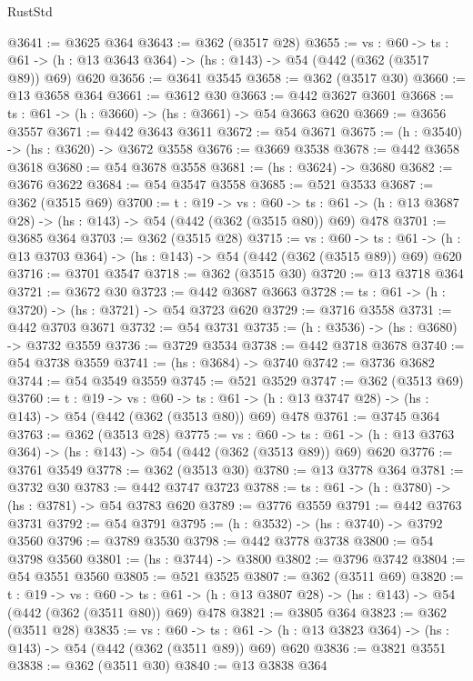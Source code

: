 \begin{lexlean}{RustStd}
\begin{coremodule}
@3641 := @3625 @364
@3643 := @362 (@3517 @28)
@3655 := {vs : @60} ->
  {ts : @61} -> (h : @13 @3643 @364) -> (hs : @143) -> @54 (@442 (@362 (@3517 @89)) @69) @620
@3656 := @3641 @3545
@3658 := @362 (@3517 @30)
@3660 := @13 @3658 @364
@3661 := @3612 @30
@3663 := @442 @3627 @3601
@3668 := {ts : @61} -> (h : @3660) -> (hs : @3661) -> @54 @3663 @620
@3669 := @3656 @3557
@3671 := @442 @3643 @3611
@3672 := @54 @3671
@3675 := (h : @3540) -> (hs : @3620) -> @3672 @3558
@3676 := @3669 @3538
@3678 := @442 @3658 @3618
@3680 := @54 @3678 @3558
@3681 := (hs : @3624) -> @3680
@3682 := @3676 @3622
@3684 := @54 @3547 @3558
@3685 := @521 @3533
@3687 := @362 (@3515 @69)
@3700 := {t : @19} ->
  {vs : @60} ->
  {ts : @61} -> (h : @13 @3687 @28) -> (hs : @143) -> @54 (@442 (@362 (@3515 @80)) @69) @478
@3701 := @3685 @364
@3703 := @362 (@3515 @28)
@3715 := {vs : @60} ->
  {ts : @61} -> (h : @13 @3703 @364) -> (hs : @143) -> @54 (@442 (@362 (@3515 @89)) @69) @620
@3716 := @3701 @3547
@3718 := @362 (@3515 @30)
@3720 := @13 @3718 @364
@3721 := @3672 @30
@3723 := @442 @3687 @3663
@3728 := {ts : @61} -> (h : @3720) -> (hs : @3721) -> @54 @3723 @620
@3729 := @3716 @3558
@3731 := @442 @3703 @3671
@3732 := @54 @3731
@3735 := (h : @3536) -> (hs : @3680) -> @3732 @3559
@3736 := @3729 @3534
@3738 := @442 @3718 @3678
@3740 := @54 @3738 @3559
@3741 := (hs : @3684) -> @3740
@3742 := @3736 @3682
@3744 := @54 @3549 @3559
@3745 := @521 @3529
@3747 := @362 (@3513 @69)
@3760 := {t : @19} ->
  {vs : @60} ->
  {ts : @61} -> (h : @13 @3747 @28) -> (hs : @143) -> @54 (@442 (@362 (@3513 @80)) @69) @478
@3761 := @3745 @364
@3763 := @362 (@3513 @28)
@3775 := {vs : @60} ->
  {ts : @61} -> (h : @13 @3763 @364) -> (hs : @143) -> @54 (@442 (@362 (@3513 @89)) @69) @620
@3776 := @3761 @3549
@3778 := @362 (@3513 @30)
@3780 := @13 @3778 @364
@3781 := @3732 @30
@3783 := @442 @3747 @3723
@3788 := {ts : @61} -> (h : @3780) -> (hs : @3781) -> @54 @3783 @620
@3789 := @3776 @3559
@3791 := @442 @3763 @3731
@3792 := @54 @3791
@3795 := (h : @3532) -> (hs : @3740) -> @3792 @3560
@3796 := @3789 @3530
@3798 := @442 @3778 @3738
@3800 := @54 @3798 @3560
@3801 := (hs : @3744) -> @3800
@3802 := @3796 @3742
@3804 := @54 @3551 @3560
@3805 := @521 @3525
@3807 := @362 (@3511 @69)
@3820 := {t : @19} ->
  {vs : @60} ->
  {ts : @61} -> (h : @13 @3807 @28) -> (hs : @143) -> @54 (@442 (@362 (@3511 @80)) @69) @478
@3821 := @3805 @364
@3823 := @362 (@3511 @28)
@3835 := {vs : @60} ->
  {ts : @61} -> (h : @13 @3823 @364) -> (hs : @143) -> @54 (@442 (@362 (@3511 @89)) @69) @620
@3836 := @3821 @3551
@3838 := @362 (@3511 @30)
@3840 := @13 @3838 @364

\end{coremodule}
\end{lexlean}
